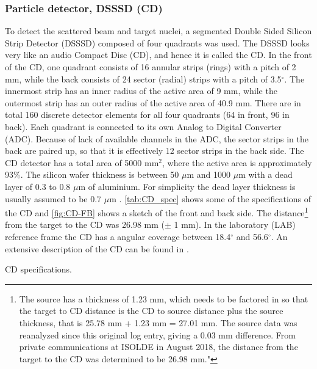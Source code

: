 \documentclass[twoside,english]{uiofysmaster/uiofysmaster}
\begin{document}
\subsubsection{Particle detector, DSSSD (CD)}
To detect the scattered beam and target nuclei, a segmented Double Sided Silicon Strip Detector (DSSSD) composed of four quadrants was used. The DSSSD looks very like an audio Compact Disc (CD), and hence it is called the CD. In the front of the CD, one quadrant consists of 16 annular strips (rings) with a pitch of 2 mm, while the back consists of 24 sector (radial) strips with a pitch of 3.5$^\circ$. The innermost strip has an inner radius of the active area of 9 mm, while the outermost strip has an outer radius of the active area of 40.9 mm. There are in total 160 discrete detector elements for all four quadrants (64 in front, 96 in back). Each quadrant is connected to its own Analog to Digital Converter (ADC). Because of lack of available channels in the ADC, the sector strips in the back are paired up, so that it is effectively 12 sector strips in the back side. The CD detector has a total area of 5000 mm$^2$, where the active area is approximately 93$\%$. The silicon wafer thickness is between 50 $\mu$m and 1000 $\mu$m with a dead layer of 0.3 to 0.8 $\mu$m of aluminium. For simplicity the dead layer thickness is usually assumed to be 0.7 $\mu$m \cite{NWarr-CD, MB-spect}. \autoref{tab:CD_spec} shows some of the specifications of the CD and \autoref{fig:CD-FB} shows a sketch of the front and back side. 
The distance\footnote{The source has a thickness of 1.23 mm, which needs to be factored in so that the target to CD distance is the CD to source distance plus the source thickness, that is 25.78 mm + 1.23 mm = 27.01 mm. The source data was reanalyzed since this original log entry, giving a 0.03 mm difference. From private communications at ISOLDE in August 2018, the distance from the target to the CD was determined to be 26.98 mm."} from the target to the CD was 26.98 mm ($\pm$ 1 mm). In the laboratory (LAB) reference frame the CD has a angular coverage between 18.4$^\circ$ and 56.6$^\circ$. An extensive description of the CD can be found in \cite{CD-DSSSD}.

\begin{table}[ht] 
    \centering 
    \caption{CD specifications.}
	
	\label{tab:CD_spec}
\end{table}
\end{document}
